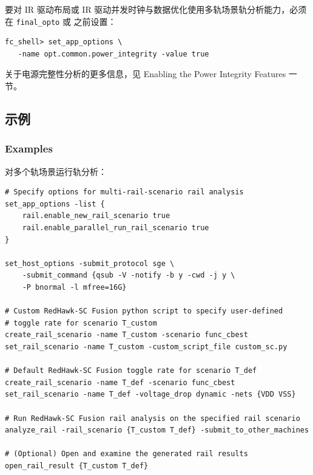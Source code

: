 \begin{noteBox}
要对 IR 驱动布局或 IR 驱动并发时钟与数据优化使用多轨场景轨分析能力，必须在   \texttt{final\_opto} 或  之前设置：
\begin{lstlisting}
fc_shell> set_app_options \
   -name opt.common.power_integrity -value true
\end{lstlisting}
关于电源完整性分析的更多信息，见 Enabling the Power Integrity Features 一节。
\end{noteBox}

\subsection{示例}
\subsubsection*{Examples}

对多个轨场景运行轨分析：
\begin{lstlisting}
# Specify options for multi-rail-scenario rail analysis
set_app_options -list {
    rail.enable_new_rail_scenario true
    rail.enable_parallel_run_rail_scenario true
}

set_host_options -submit_protocol sge \
    -submit_command {qsub -V -notify -b y -cwd -j y \
    -P bnormal -l mfree=16G}

# Custom RedHawk-SC Fusion python script to specify user-defined
# toggle rate for scenario T_custom
create_rail_scenario -name T_custom -scenario func_cbest
set_rail_scenario -name T_custom -custom_script_file custom_sc.py

# Default RedHawk-SC Fusion toggle rate for scenario T_def
create_rail_scenario -name T_def -scenario func_cbest
set_rail_scenario -name T_def -voltage_drop dynamic -nets {VDD VSS}

# Run RedHawk-SC Fusion rail analysis on the specified rail scenario
analyze_rail -rail_scenario {T_custom T_def} -submit_to_other_machines

# (Optional) Open and examine the generated rail results
open_rail_result {T_custom T_def}
\end{lstlisting}

